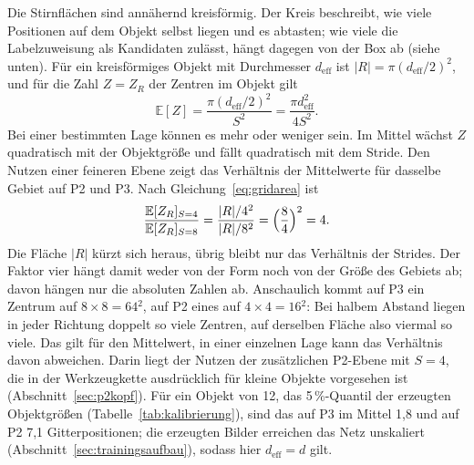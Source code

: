 Die Stirnflächen sind annähernd kreisförmig. Der Kreis beschreibt, wie viele
Positionen auf dem Objekt selbst liegen und es abtasten; wie viele die
Labelzuweisung als Kandidaten zulässt, hängt dagegen von der Box ab (siehe
unten). Für ein kreisförmiges Objekt mit Durchmesser $d_{\mathrm{eff}}$ ist $|R| = \pi (d_{\mathrm{eff}}/2)^{2}$, und für
die Zahl $Z = Z_R$ der Zentren im Objekt gilt
\begin{equation}
  \mathbb{E}[Z]
  =
  \frac{\pi (d_{\mathrm{eff}}/2)^{2}}{S^{2}}
  =
  \frac{\pi d_{\mathrm{eff}}^{2}}{4S^{2}}.
  \label{eq:gridcount}
\end{equation}
Bei einer bestimmten Lage können es mehr oder weniger sein. Im Mittel wächst
$Z$ quadratisch mit der Objektgröße und fällt quadratisch mit dem Stride. Den
Nutzen einer feineren Ebene zeigt das Verhältnis der Mittelwerte für dasselbe
Gebiet auf P2 und P3. Nach Gleichung~\eqref{eq:gridarea} ist
\begin{equation}
  \frac{\mathbb{E}[Z_R]_{S=4}}{\mathbb{E}[Z_R]_{S=8}}
  =
  \frac{|R|/4^{2}}{|R|/8^{2}}
  =
  \Bigl(\frac{8}{4}\Bigr)^{2}
  =
  4 .
  \label{eq:gridratio}
\end{equation}
Die Fläche $|R|$ kürzt sich heraus, übrig bleibt nur das Verhältnis der
Strides. Der Faktor vier hängt damit weder von der Form noch von der Größe des
Gebiets ab; davon hängen nur die absoluten Zahlen ab. Anschaulich kommt auf P3
ein Zentrum auf $8\times8 = 64$\px$^2$, auf P2 eines auf $4\times4 = 16$\px$^2$:
Bei halbem Abstand liegen in jeder Richtung doppelt so viele Zentren, auf
derselben Fläche also viermal so viele. Das gilt für den Mittelwert, in einer
einzelnen Lage kann das Verhältnis davon abweichen. Darin liegt der Nutzen der
zusätzlichen P2-Ebene mit $S=4$, die in
der Werkzeugkette ausdrücklich für kleine Objekte vorgesehen ist
\parencite{ultralyticsdocs} (Abschnitt~\ref{sec:p2kopf}). Für ein Objekt von
12\px, das 5\,\%-Quantil der erzeugten Objektgrößen
(Tabelle~\ref{tab:kalibrierung}), sind das auf P3 im Mittel 1,8 und auf P2 7,1
Gitterpositionen; die erzeugten Bilder erreichen das Netz unskaliert
(Abschnitt~\ref{sec:trainingsaufbau}), sodass hier $d_{\mathrm{eff}} = d$ gilt.

